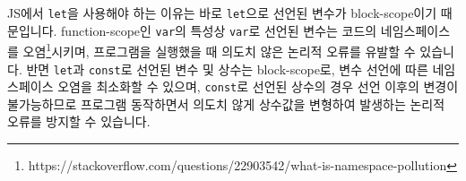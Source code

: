 JS에서 \verb|let|을 사용해야 하는 이유는 바로 \verb|let|으로 선언된 변수가 block-scope이기 때문입니다. function-scope인 \verb|var|의 특성상 \verb|var|로 선언된 변수는 코드의 네임스페이스를 오염\footnote{https://stackoverflow.com/questions/22903542/what-is-namespace-pollution}시키며, 프로그램을 실행했을 때 의도치 않은 논리적 오류를 유발할 수 있습니다. 반면 \verb|let|과 \verb|const|로 선언된 변수 및 상수는 block-scope로, 변수 선언에 따른 네임스페이스 오염을 최소화할 수 있으며, \verb|const|로 선언된 상수의 경우 선언 이후의 변경이 불가능하므로 프로그램 동작하면서 의도치 않게 상수값을 변형하여 발생하는 논리적 오류를 방지할 수 있습니다. 
